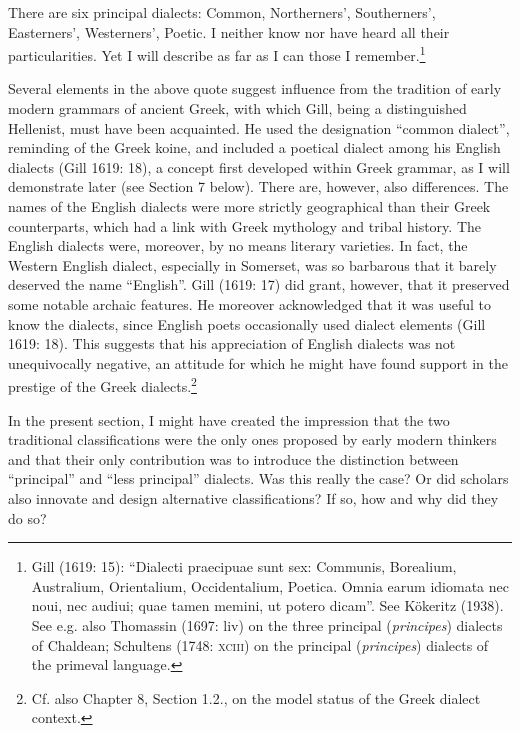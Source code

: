 \documentclass[12pt]{article}
\newenvironment{styleStandard}{\renewcommand\baselinestretch{1.25}\setlength\leftskip{0in}\setlength\rightskip{0in}\setlength\parindent{0.1972in}\setlength\parfillskip{0pt plus 1fil}\setlength\parskip{0in plus 1pt}\writerlistparindent\writerlistleftskip\leavevmode\normalfont\normalsize\writerlistlabel\ignorespaces}{\unskip\vspace{0in plus 1pt}\par}
\newenvironment{styleQuote}{\renewcommand\baselinestretch{1.25}\setlength\leftskip{0.3937in}\setlength\rightskip{0in}\setlength\parindent{0in}\setlength\parfillskip{0pt plus 1fil}\setlength\parskip{0.1665in plus 0.016649999in}\writerlistparindent\writerlistleftskip\leavevmode\normalfont\normalsize\writerlistlabel\ignorespaces}{\unskip\vspace{0.1665in plus 0.016649999in}\par}
\newcommand\writerlistleftskip{}
\newcommand\writerlistparindent{}
\newcommand\writerlistlabel{}
\begin{document}
\begin{styleQuote}
There are six principal dialects: Common, Northerners’, Southerners’, Easterners’, Westerners’, Poetic. I neither know nor have heard all their particularities. Yet I will describe as far as I can those I remember.\footnote{ Gill (1619: 15): “Dialecti praecipuae sunt sex: Communis, Borealium, Australium, Orientalium, Occidentalium, Poetica. Omnia earum idiomata nec noui, nec audiui; quae tamen memini, ut potero dicam”. See Kökeritz (1938). See e.g. also Thomassin (1697: liv) on the three principal (\textit{principes}) dialects of Chaldean; Schultens (1748: \textsc{xciii}) on the principal (\textit{principes}) dialects of the primeval language.}
\end{styleQuote}

\begin{styleStandard}
Several elements in the above quote suggest influence from the tradition of early modern grammars of ancient Greek, with which Gill, being a distinguished Hellenist, must have been acquainted. He used the designation “common dialect”, reminding of the Greek koine, and included a poetical dialect among his English dialects (Gill 1619: 18), a concept first developed within Greek grammar, as I will demonstrate later (see Section 7 below). There are, however, also differences. The names of the English dialects were more strictly geographical than their Greek counterparts, which had a link with Greek mythology and tribal history. The English dialects were, moreover, by no means literary varieties. In fact, the Western English dialect, especially in Somerset, was so barbarous that it barely deserved the name “English”. Gill (1619: 17) did grant, however, that it preserved some notable archaic features. He moreover acknowledged that it was useful to know the dialects, since English poets occasionally used dialect elements (Gill 1619: 18). This suggests that his appreciation of English dialects was not unequivocally negative, an attitude for which he might have found support in the prestige of the Greek dialects.\footnote{ Cf. also Chapter 8, Section 1.2., on the model status of the Greek dialect context.}
\end{styleStandard}

\begin{styleStandard}
In the present section, I might have created the impression that the two traditional classifications were the only ones proposed by early modern thinkers and that their only contribution was to introduce the distinction between “principal” and “less principal” dialects. Was this really the case? Or did scholars also innovate and design alternative classifications? If so, how and why did they do so?
\end{styleStandard}
\end{document}
